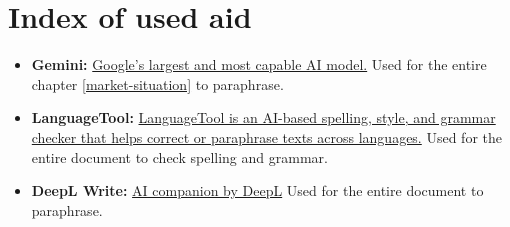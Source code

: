 \chapter{Index of used aid}\label{label-aid-index}

\begin{itemize}
  \item \textbf{Gemini:} \href{https://gemini.google.com/}{Google's largest and most capable AI model.} Used for the entire chapter \ref{market-situation} to paraphrase.
  \item \textbf{LanguageTool:} \href{https://languagetool.org/}{LanguageTool is an AI-based spelling, style, and grammar checker that helps correct or paraphrase texts across languages.} Used for the entire document to check spelling and grammar.
  \item \textbf{DeepL Write:} \href{https://www.deepl.com/write}{AI companion by DeepL} Used for the entire document to paraphrase.
\end{itemize}